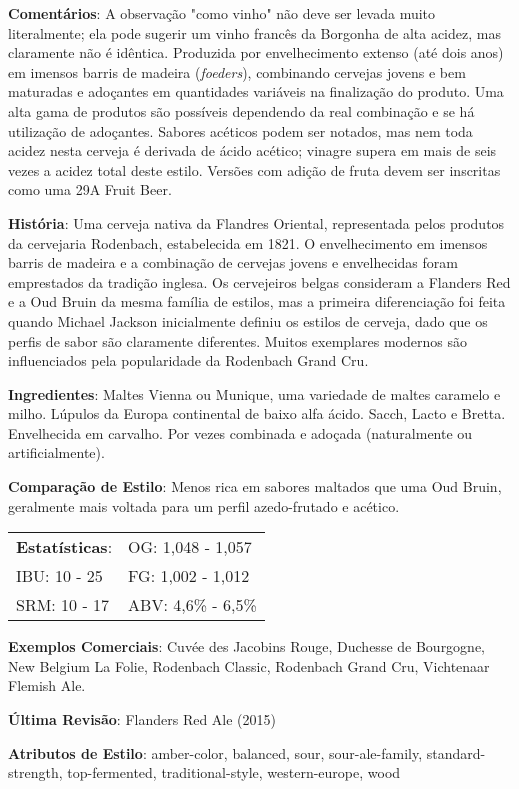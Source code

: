 \textbf{Comentários}: A observação "como vinho" não deve ser levada muito literalmente; ela pode sugerir um vinho francês da Borgonha de alta acidez, mas claramente não é idêntica. Produzida por envelhecimento extenso (até dois anos) em imensos barris de madeira (\textit{foeders}), combinando cervejas jovens e bem maturadas e adoçantes em quantidades variáveis na finalização do produto. Uma alta gama de produtos são possíveis dependendo da real combinação e se há utilização de adoçantes. Sabores acéticos podem ser notados, mas nem toda acidez nesta cerveja é derivada de ácido acético; vinagre supera em mais de seis vezes a acidez total deste estilo. Versões com adição de fruta devem ser inscritas como uma 29A Fruit Beer.

\textbf{História}: Uma cerveja nativa da Flandres Oriental, representada pelos produtos da cervejaria Rodenbach, estabelecida em 1821. O envelhecimento em imensos barris de madeira e a combinação de cervejas jovens e envelhecidas foram emprestados da tradição inglesa. Os cervejeiros belgas consideram a Flanders Red e a Oud Bruin da mesma família de estilos, mas a primeira diferenciação foi feita quando Michael Jackson inicialmente definiu os estilos de cerveja, dado que os perfis de sabor são claramente diferentes. Muitos exemplares modernos são influenciados pela popularidade da Rodenbach Grand Cru.

\textbf{Ingredientes}: Maltes Vienna ou Munique, uma variedade de maltes caramelo e milho. Lúpulos da Europa continental de baixo alfa ácido. Sacch, Lacto e Bretta. Envelhecida em carvalho. Por vezes combinada e adoçada (naturalmente ou artificialmente).

\textbf{Comparação de Estilo}: Menos rica em sabores maltados que uma Oud Bruin, geralmente mais voltada para um perfil azedo-frutado e acético.

\begin{tabular}{@{}p{35mm}p{35mm}@{}}
  \textbf{Estatísticas}: & OG: 1,048 - 1,057 \\
  IBU: 10 - 25  & FG: 1,002 - 1,012  \\
  SRM: 10 - 17  & ABV: 4,6\% - 6,5\%
\end{tabular}

\textbf{Exemplos Comerciais}: Cuvée des Jacobins Rouge, Duchesse de Bourgogne, New Belgium La Folie, Rodenbach Classic, Rodenbach Grand Cru, Vichtenaar Flemish Ale.

\textbf{Última Revisão}: Flanders Red Ale (2015)

\textbf{Atributos de Estilo}: amber-color, balanced, sour, sour-ale-family, standard-strength, top-fermented, traditional-style, western-europe, wood
